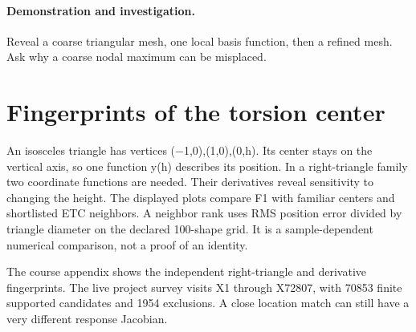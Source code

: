 \documentclass[11pt,oneside,openany]{book}
\begin{document}
\paragraph{Demonstration and investigation.} Reveal a coarse triangular mesh, one local basis function, then a refined mesh. Ask why a coarse nodal maximum can be misplaced.


\section{Fingerprints of the torsion center}\label{sec:slide44}

An isosceles triangle has vertices (\ensuremath{-}1,0),(1,0),(0,h). Its center stays on the vertical axis, so one function y(h) describes its position. In a right-triangle family two coordinate functions are needed. Their derivatives reveal sensitivity to changing the height. The displayed plots compare F1 with familiar centers and shortlisted ETC neighbors. A neighbor rank uses RMS position error divided by triangle diameter on the declared 100-shape grid. It is a sample-dependent numerical comparison, not a proof of an identity.


The course appendix shows the independent right-triangle and derivative fingerprints. The live project survey visits X1 through X72807, with 70853 finite supported candidates and 1954 exclusions. A close location match can still have a very different response Jacobian.
\end{document}
